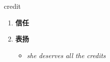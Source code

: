 
\begin{frame}
{\huge credit}
\begin{center}
\begin{enumerate}\Large
  \item \textbf{信任}
  \item \textbf{表扬}
  \begin{itemize}
    \item \em{\Large{she deserves all the credits}}
  \end{itemize}
\end{enumerate}
\end{center}
\end{frame}
